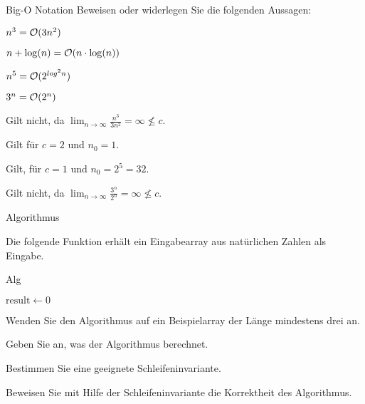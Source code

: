 \documentclass{exercisesheet}
\begin{document}
\begin{eexercises}{Big-O Notation}{
    Beweisen oder widerlegen Sie die folgenden Aussagen:
  }
  \item $n^3 = \mathcal{O}(3n^2)$
  \item $n + \log(n) = \mathcal{O}(n \cdot \log(n))$
  \item $n^5 = \mathcal{O}(2^{log^2{n}})$
  \item $3^n = \mathcal{O}(2^n)$
\end{eexercises}

\begin{solutions}
  \item Gilt nicht, da $\lim_{n\to\infty} \frac{n^3}{3n^2} = \infty \not\le c$.
  \item Gilt für $c = 2$ und $n_0 = 1$.
  \item Gilt, für $c = 1$ und $n_0 = 2^5 = 32$.
  \item Gilt nicht, da $\lim_{n\to\infty} \frac{3^n}{2^n} = \infty \not\le c$.
\end{solutions}

\begin{eexercises}{Algorithmus}{
    Die folgende Funktion erhält ein Eingabearray aus natürlichen Zahlen als Eingabe.
    \begin{algorithm}[ht]
      \caption{Alg}
      $\text{result} \gets 0$ \\
    \end{algorithm}
  }
  \item Wenden Sie den Algorithmus auf ein Beispielarray der Länge mindestens drei an.
  \item Geben Sie an, was der Algorithmus berechnet.
  \item Bestimmen Sie eine geeignete Schleifeninvariante.
  \item Beweisen Sie mit Hilfe der Schleifeninvariante die Korrektheit des Algorithmus.
\end{eexercises}
\end{document}
